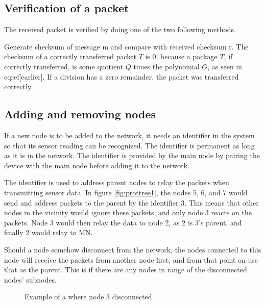 \subsection{Verification of a packet}
The received packet is verified by doing one of the two following methods. 

Generate checksum of message m and compare with received checksum r.
The checksum of a correctly transferred packet $T$ is 0, because a package $T$, if correctly transferred, is some quotient $Q$ times the polynomial $G$, as seen in eqref[earlier]. If a division has a zero remainder, the packet was transferred correctly.




\subsection{Adding and removing nodes}
If a new node is to be added to the network, it needs an identifier in the system so that its sensor reading can be recognized. The identifier is permanent as long as it is in the network.
The identifier is provided by the main node by pairing the device with the main node before adding it to the network. 

The identifier is used to address parent nodes to relay the packets when transmitting sensor data. In figure \ref{fig:prottree1}, the nodes 5, 6, and 7 would send and address packets to the parent by the identifier 3. This means that other nodes in the vicinity would ignore these packets, and only node 3 reacts on the packets. Node 3 would then relay the data to node 2, as 2 is 3's parent, and finally 2 would relay to MN.

Should a node somehow disconnect from the network, the nodes connected to this node will receive the packets from another node first, and from that point on use that as the parent. This is if there are any nodes in range of the disconnected nodes' subnodes. 

\begin{figure}[!h]
	\centering
	\caption{Example of a where node 3 disconnected.}
	\label{fig:prottree2}
\end{figure}

